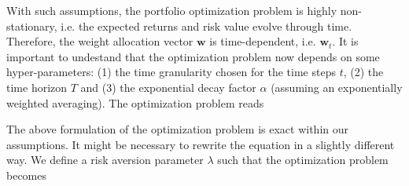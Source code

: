 \documentclass[a4paper,12pt]{report}
\begin{document}
With such assumptions, the portfolio optimization problem is highly non-stationary, i.e. the expected returns and risk value evolve through time. Therefore, the weight allocation vector $\mathbf{w}$ is time-dependent, i.e. $\mathbf{w}_t$. It is important to undestand that the optimization problem now depends on some hyper-parameters: (1) the time granularity chosen for the time steps $t$, (2) the time horizon $T$ and (3) the exponential decay factor $\alpha$ (assuming an exponentially weighted averaging). The optimization problem reads
\begin{center}
\end{center}
The above formulation of the optimization problem is exact within our assumptions. It might be necessary to rewrite the equation in a slightly different way. We define a risk aversion parameter $\lambda$ such that the optimization problem becomes
\begin{center}
\end{center}
\end{document}
